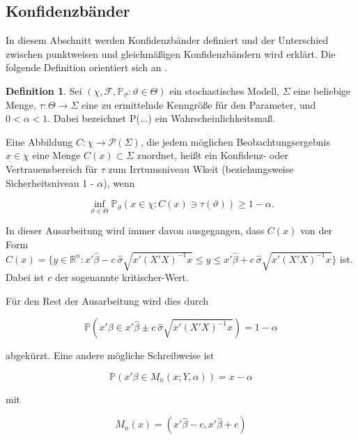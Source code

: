 \documentclass[12pt,a4paper]{article}
\theoremstyle{definition}
\newtheorem{Definition}{Definition}[subsection]
\theoremstyle{definition}
\theoremstyle{definition}
\theoremstyle{definition}
\begin{document}
\subsection{Konfidenzbänder}
\label{Konfidenzbaender}
In diesem Abschnitt werden Konfidenzbänder definiert und der Unterschied zwischen punktweisen und gleichmäßigen Konfidenzbändern wird erklärt. Die folgende Definition orientiert sich an \cite[229]{Georgii09}.

\begin{Definition}
Sei $( \chi, \mathscr{F} , \mathbb{P}_\vartheta : \vartheta \in \Theta) $ ein stochastisches Modell, $\Sigma$ eine beliebige Menge, $\tau : \Theta \rightarrow \Sigma $ eine zu ermittelnde Kenngröße für den Parameter, und $0 < \alpha < 1$. Dabei bezeichnet \gls{P(...)} ein Wahrscheinlichkeitsmaß.

Eine Abbildung $C : \chi \rightarrow \mathscr{P}(\Sigma)$, die jedem möglichen Beobachtungsergebnis $x \in \chi$ eine Menge $C(x) \subset \Sigma$ zuordnet, heißt ein Konfidenz- oder Vertrauensbereich für $\tau$ zum Irrtumsniveau \gls{Wkeit} (beziehungsweise Sicherheitsniveau 1 - $\alpha$), wenn

\begin{equation*}
\inf_{\vartheta \in \Theta} \mathbb{P}_{\vartheta}(x \in \chi : C(x) \ni \tau(\vartheta)) \geq 1 - \alpha.
\end{equation*}

\end{Definition}

In dieser Ausarbeitung wird immer davon ausgegangen, dass $C(x)$ von der Form $C(x) = \{ y \in \mathbb{R}^n :  x'\hat{\beta} - c ~ \hat{\sigma}\sqrt{x'(X'X)^{-1}x} \leq y \leq x'\hat{\beta} + c ~ \hat{\sigma}\sqrt{x'(X'X)^{-1}x} \}$ ist. Dabei ist $c$ der sogenannte  \gls{kritischer-Wert}.
 
Für den Rest der Ausarbeitung wird dies durch

\begin{equation*}
\mathbb{P}(x' \beta \in x'\hat{\beta} \pm c ~ \hat{\sigma}\sqrt{x'(X'X)^{-1}x}) = 1 - \alpha
\end{equation*} 

abgekürzt. Eine andere mögliche Schreibweise ist 

\begin{equation*}
\mathbb{P}(x'\beta \in M_n(x;Y,\alpha)) = x - \alpha
\end{equation*}

mit 

\begin{equation*}
M_n(x) = (x'\hat{\beta} -c, x'\hat{\beta} +c) 
\end{equation*}
\end{document}

